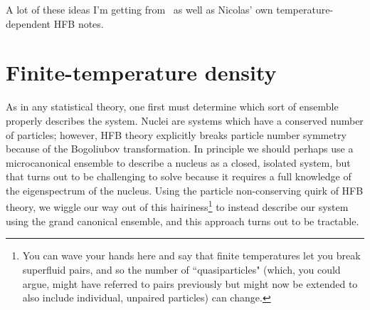 %
%


A lot of these ideas I'm getting from~\cite{Schunck2015b} as well as Nicolas' own temperature-dependent HFB notes.

\section{Finite-temperature density}

As in any statistical theory, one first must determine which sort of ensemble properly describes the system. Nuclei are systems which have a conserved number of particles; however, HFB theory explicitly breaks particle number symmetry because of the Bogoliubov transformation. In principle we should perhaps use a microcanonical ensemble to describe a nucleus as a closed, isolated system, but that turns out to be challenging to solve because it requires a full knowledge of the eigenspectrum of the nucleus. Using the particle non-conserving quirk of HFB theory, we wiggle our way out of this hairiness\footnote{You can wave your hands here and say that finite temperatures let you break superfluid pairs, and so the number of ``quasiparticles" (which, you could argue, might have referred to pairs previously but might now be extended to also include individual, unpaired particles) can change.} to instead describe our system using the grand canonical ensemble, and this approach turns out to be tractable.

